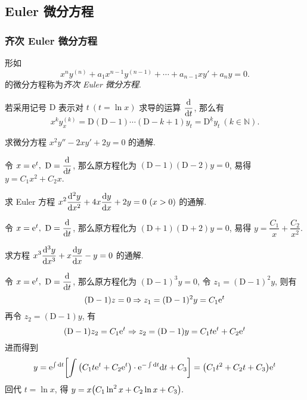 \subsection{Euler 微分方程}

\subsubsection{齐次 Euler 微分方程}

\begin{definition}
    形如 $$x^ny^{(n)}+a_1x^{n-1}y^{(n-1)}+\cdots+a_{n-1}xy'+a_ny=0.$$
    的微分方程称为\textit{齐次 Euler 微分方程}.
\end{definition}

\begin{theorem}
    若采用记号 $\mathrm{D}$ 表示对 $t~(t=\ln x)$ 求导的运算 $\displaystyle\dv{t}$, 那么有
    $$x^ky_{x}^{(k)}=\mathrm{D}(\mathrm{D}-1)\cdots(\mathrm{D}-k+1)y_{t}=\mathrm{D}^{\underline{k}}y_{t}~(k\in \mathbb{N}).$$
\end{theorem}

\begin{example}
    \label{x2y2xy2y0}求微分方程 $x^2y''-2xy'+2y=0$ 的通解.
\end{example}
\begin{solution}
    令 $x=\mathrm{e} ^t,~\mathrm{D}=\displaystyle\dv{t}$, 那么原方程化为 $(\mathrm{D}-1)(\mathrm{D}-2)y=0$, 易得 $y=C_1x^2+C_2x.$
\end{solution}

\begin{example}
    求 Euler 方程 $\displaystyle x^2\dv[2]{y}{x}+4x\dv{y}{x}+2y=0~(x>0)$ 的通解.
\end{example}
\begin{solution}
    令 $x=\mathrm{e} ^t,~\mathrm{D}=\displaystyle\dv{t}$, 那么原方程化为 $(\mathrm{D}+1)(\mathrm{D}+2)y=0$, 易得 $y=\dfrac{C_1}{x}+\dfrac{C_2}{x^2}.$
\end{solution}

\begin{example}
    求方程 $\displaystyle x^3\dv[3]{y}{x}+x\dv{y}{x}-y=0$ 的通解.
\end{example}
\begin{solution}
    令 $x=\mathrm{e} ^t,~\mathrm{D}=\displaystyle\dv{t}$, 那么原方程化为 $(\mathrm{D}-1)^3y=0$, 令 $z_1=(\mathrm{D}-1)^2y$, 则有
    $$
        (\mathrm{D}-1)z=0\Rightarrow z_1=(\mathrm{D}-1)^2y=C_1\mathrm{e} ^{t}
    $$
    再令 $z_2=(\mathrm{D}-1)y$, 有 $$(\mathrm{D}-1)z_{2}=C_1\mathrm{e} ^{t}\Rightarrow z_2=(\mathrm{D}-1)y=C_1t\mathrm{e} ^{t}+C_2\mathrm{e} ^{t}$$
    进而得到 $$y=\mathrm{e} ^{\int \dd t}\qty[\int\qty(C_1t \mathrm{e} ^{t}+C_2\mathrm{e} ^{t})\cdot \mathrm{e} ^{-\int \dd  t}\dd  t+C_3]=\qty(C_1t^2+C_2t+C_3)\mathrm{e} ^{t}$$ 回代 $t=\ln x$, 得 $y=x\qty(C_1\ln^2x+C_2\ln x+C_3).$
\end{solution}

